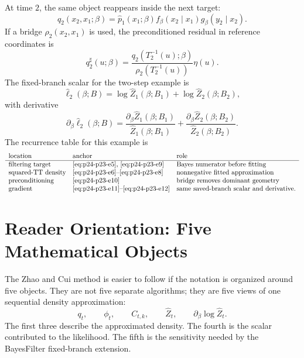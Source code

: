 \documentclass[11pt]{article}
\numberwithin{equation}{section}
\begin{document}
At time \(2\), the same object reappears inside the next target:
\begin{equation}
    q_2(x_2,x_1;\beta)
    =
    \widehat p_1(x_1;\beta)
    f_\beta(x_2\mid x_1)
    g_\beta(y_2\mid x_2).
    \label{eq:p24-p23-e9}
\end{equation}
If a bridge \(\rho_2(x_2,x_1)\) is used, the preconditioned residual in
reference coordinates is
\begin{equation}
    q_2^\sharp(u;\beta)
    =
    \frac{q_2(T_2^{-1}(u);\beta)}
    {\rho_2(T_2^{-1}(u))}
    \eta(u).
    \label{eq:p24-p23-e10}
\end{equation}
The fixed-branch scalar for the two-step example is
\begin{equation}
    \widehat\ell_2(\beta;B)
    =
    \log\widehat Z_1(\beta;B_1)
    +
    \log\widehat Z_2(\beta;B_2),
    \label{eq:p24-p23-e11}
\end{equation}
with derivative
\begin{equation}
    \partial_\beta\widehat\ell_2(\beta;B)
    =
    \frac{\partial_\beta\widehat Z_1(\beta;B_1)}
    {\widehat Z_1(\beta;B_1)}
    +
    \frac{\partial_\beta\widehat Z_2(\beta;B_2)}
    {\widehat Z_2(\beta;B_2)}.
    \label{eq:p24-p23-e12}
\end{equation}
The recurrence table for this example is
\begin{equation}
\begin{array}{lll}
\text{location} & \text{anchor} & \text{role}\\
\hline
\text{filtering target} & \text{\eqref{eq:p24-p23-e5}, \eqref{eq:p24-p23-e9}} &
    \text{Bayes numerator before fitting}\\
\text{squared-TT density} & \text{\eqref{eq:p24-p23-e6}--\eqref{eq:p24-p23-e8}} &
    \text{nonnegative fitted approximation}\\
\text{preconditioning} & \text{\eqref{eq:p24-p23-e10}} &
    \text{bridge removes dominant geometry}\\
\text{gradient} & \text{\eqref{eq:p24-p23-e11}--\eqref{eq:p24-p23-e12}} &
    \text{same saved-branch scalar and derivative.}
\end{array}
\label{eq:p24-p23-e13}
\end{equation}

\section{Reader Orientation: Five Mathematical Objects}

The Zhao and Cui \cite{zhao2024ttsequential} method is easier to follow if the notation is organized around
five objects.  They are not five separate algorithms; they are five views of
one sequential density approximation:
\begin{equation}
    q_t,\qquad \phi_t,\qquad C_{t,k},\qquad \widehat Z_t,
    \qquad \partial_\beta\log\widehat Z_t .
    \label{eq:p24-p22-o1}
\end{equation}
The first three describe the approximated density.  The fourth is the scalar
contributed to the likelihood.  The fifth is the sensitivity needed by the
BayesFilter fixed-branch extension.
\end{document}
